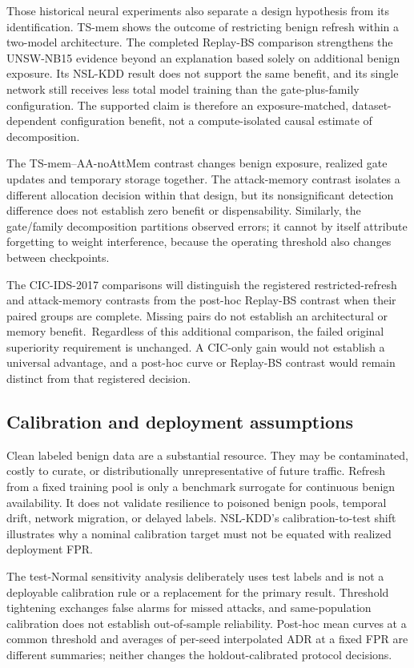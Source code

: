 \documentclass[10pt,twocolumn]{article}
\providecommand{\CICInterpretationText}{The CIC-IDS-2017 comparisons will distinguish the registered restricted-refresh and attack-memory contrasts from the post-hoc Replay-BS contrast when their paired groups are complete. Missing pairs do not establish an architectural or memory benefit.}
\begin{document}
Those historical neural experiments also separate a design hypothesis from its identification. TS-mem shows the outcome of restricting benign refresh within a two-model architecture. The completed Replay-BS comparison strengthens the UNSW-NB15 evidence beyond an explanation based solely on additional benign exposure. Its NSL-KDD result does not support the same benefit, and its single network still receives less total model training than the gate-plus-family configuration. The supported claim is therefore an exposure-matched, dataset-dependent configuration benefit, not a compute-isolated causal estimate of decomposition.

The TS-mem--AA-noAttMem contrast changes benign exposure, realized gate updates and temporary storage together. The attack-memory contrast isolates a different allocation decision within that design, but its nonsignificant detection difference does not establish zero benefit or dispensability. Similarly, the gate/family decomposition partitions observed errors; it cannot by itself attribute forgetting to weight interference, because the operating threshold also changes between checkpoints.

\CICInterpretationText\ Regardless of this additional comparison, the failed original superiority requirement is unchanged. A CIC-only gain would not establish a universal advantage, and a post-hoc curve or Replay-BS contrast would remain distinct from that registered decision.

\subsection{Calibration and deployment assumptions}
Clean labeled benign data are a substantial resource. They may be contaminated, costly to curate, or distributionally unrepresentative of future traffic. Refresh from a fixed training pool is only a benchmark surrogate for continuous benign availability. It does not validate resilience to poisoned benign pools, temporal drift, network migration, or delayed labels. NSL-KDD's calibration-to-test shift illustrates why a nominal calibration target must not be equated with realized deployment FPR.

The test-Normal sensitivity analysis deliberately uses test labels and is not a deployable calibration rule or a replacement for the primary result. Threshold tightening exchanges false alarms for missed attacks, and same-population calibration does not establish out-of-sample reliability. Post-hoc mean curves at a common threshold and averages of per-seed interpolated ADR at a fixed FPR are different summaries; neither changes the holdout-calibrated protocol decisions.
\end{document}
